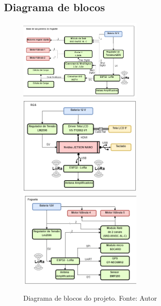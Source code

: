 \begin{apendicesenv}
\chapter{Diagrama de blocos}
\label{Diagrama de blocos do sistema}
\begin{figure}[htb]
    \centering
    \includegraphics[width=0.55\textwidth, angle=0]{figuras/Diagrama_Geral1.png}
        \includegraphics[width=0.55\textwidth, angle=0]{figuras/Diagrama_Geral2.png}
            \includegraphics[width=0.55\textwidth, angle=0]{figuras/Diagrama_Geral3.png}
    \caption{Diagrama de blocos do projeto. Fonte: Autor}
    \label{fig:Diagrama de Blocos}
\end{figure}




\end{apendicesenv}
